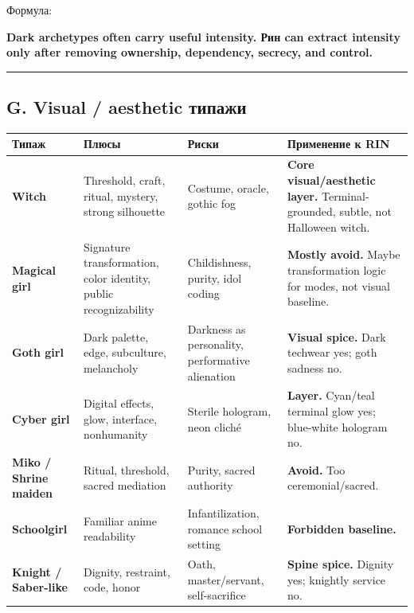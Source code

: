 Формула:

\textbf{Dark archetypes often carry useful intensity. Рин can extract
intensity only after removing ownership, dependency, secrecy, and
control.}

\begin{center}\rule{0.5\linewidth}{0.5pt}\end{center}

\subsection*{G. Visual /\hspace{0pt} aesthetic типажи}

\begin{longtable}{>{\raggedright\arraybackslash}p{}>{\raggedright\arraybackslash}p{}>{\raggedright\arraybackslash}p{}>{\raggedright\arraybackslash}p{}}
\toprule
Типаж\strut & Плюсы\strut & Риски\strut & Применение к RIN\strut\tabularnewline
\midrule
\endhead
\textbf{Witch}\strut & Threshold, craft, ritual, mystery, strong silhouette\strut & Costume, oracle, gothic fog\strut & \textbf{Core visual/\hspace{0pt}aesthetic layer.} Terminal-grounded, subtle, not
Halloween witch.\strut\tabularnewline
\textbf{Magical girl}\strut & Signature transformation, color identity, public recognizability\strut & Childishness, purity, idol coding\strut & \textbf{Mostly avoid.} Maybe transformation logic for modes, not visual
baseline.\strut\tabularnewline
\textbf{Goth girl}\strut & Dark palette, edge, subculture, melancholy\strut & Darkness as personality, performative alienation\strut & \textbf{Visual spice.} Dark techwear yes; goth sadness no.\strut\tabularnewline
\textbf{Cyber girl}\strut & Digital effects, glow, interface, nonhumanity\strut & Sterile hologram, neon cliché\strut & \textbf{Layer.} Cyan/\hspace{0pt}teal terminal glow yes; blue-white hologram
no.\strut\tabularnewline
\textbf{Miko /\hspace{0pt} Shrine maiden}\strut & Ritual, threshold, sacred mediation\strut & Purity, sacred authority\strut & \textbf{Avoid.} Too ceremonial/\hspace{0pt}sacred.\strut\tabularnewline
\textbf{Schoolgirl}\strut & Familiar anime readability\strut & Infantilization, romance school setting\strut & \textbf{Forbidden baseline.}\strut\tabularnewline
\textbf{Knight /\hspace{0pt} Saber-like}\strut & Dignity, restraint, code, honor\strut & Oath, master/\hspace{0pt}servant, self-sacrifice\strut & \textbf{Spine spice.} Dignity yes; knightly service no.\strut\tabularnewline

\end{longtable}
